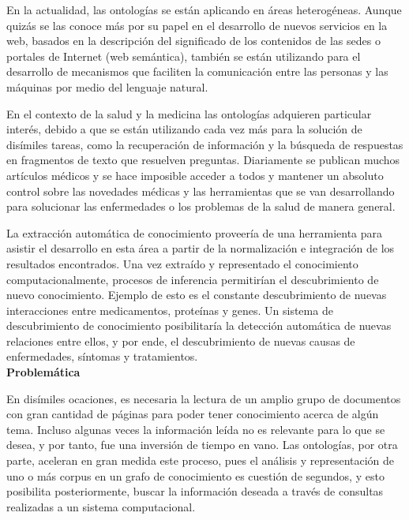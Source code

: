 En la actualidad, las ontologías se están aplicando en áreas heterogéneas. Aunque quizás se las conoce más por su papel en el desarrollo de nuevos servicios en la web, basados en la descripción del significado de los contenidos de las sedes o portales de Internet (web semántica), también se están utilizando para el desarrollo de mecanismos que faciliten la comunicación entre las personas y las máquinas por medio del lenguaje natural.~\cite{ref:2}

En el contexto de la salud y la medicina las ontologías adquieren particular interés, debido a que se están utilizando cada vez más para la solución de disímiles tareas, como la recuperación de información y la búsqueda de respuestas en fragmentos de texto que resuelven preguntas. Diariamente se publican muchos artículos médicos y se hace imposible acceder a todos y mantener un absoluto control sobre las novedades médicas y las herramientas que se van desarrollando para solucionar las enfermedades o los problemas de la salud de manera general.

La extracción automática de conocimiento proveería de una herramienta para asistir el desarrollo en esta área a partir de la normalización e integración de los resultados encontrados. Una vez extraído y representado el conocimiento computacionalmente, procesos de inferencia permitirían el descubrimiento de nuevo conocimiento. Ejemplo de esto es el constante descubrimiento de nuevas interacciones entre medicamentos, proteínas y genes. Un sistema de descubrimiento de conocimiento posibilitaría la detección automática de
nuevas relaciones entre ellos, y por ende, el descubrimiento de nuevas causas de enfermedades, síntomas y tratamientos.\\

\noindent\textbf{\large Problemática}

En disímiles ocaciones, es necesaria la lectura de un amplio grupo de documentos con gran cantidad de páginas para poder tener conocimiento acerca de algún tema. Incluso algunas veces la información leída no es relevante para lo que se desea, y por tanto, fue una inversión de tiempo en vano. Las ontologías, por otra parte, aceleran en gran medida este proceso, pues el análisis y representación de uno o más corpus en un grafo de conocimiento es cuestión de segundos, y esto posibilita posteriormente, buscar la información deseada a través de consultas realizadas a un sistema computacional.


